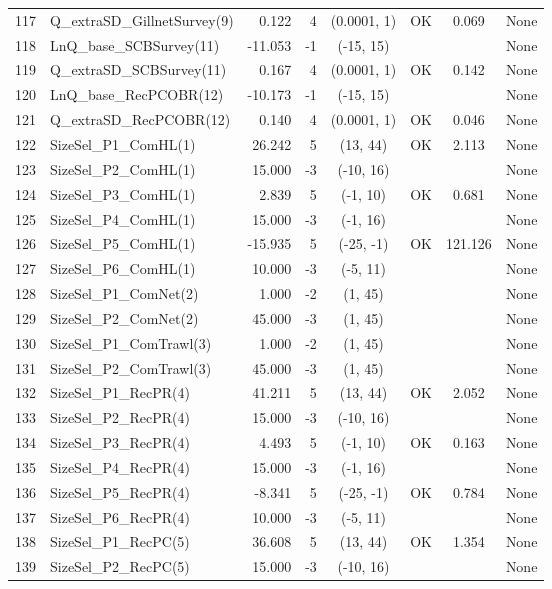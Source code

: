 \documentclass[12pt,]{article}
\begin{document}
\begin{landscape}
\begin{longtable}{rlrrcccl}
  117 & Q\_extraSD\_GillnetSurvey(9) & 0.122 & 4 & (0.0001, 1) & OK & 0.069 & None \\ 
  118 & LnQ\_base\_SCBSurvey(11) & -11.053 & -1 & (-15, 15) &  &  & None \\ 
  119 & Q\_extraSD\_SCBSurvey(11) & 0.167 & 4 & (0.0001, 1) & OK & 0.142 & None \\ 
  120 & LnQ\_base\_RecPCOBR(12) & -10.173 & -1 & (-15, 15) &  &  & None \\ 
  121 & Q\_extraSD\_RecPCOBR(12) & 0.140 & 4 & (0.0001, 1) & OK & 0.046 & None \\ 
  122 & SizeSel\_P1\_ComHL(1) & 26.242 & 5 & (13, 44) & OK & 2.113 & None \\ 
  123 & SizeSel\_P2\_ComHL(1) & 15.000 & -3 & (-10, 16) &  &  & None \\ 
  124 & SizeSel\_P3\_ComHL(1) & 2.839 & 5 & (-1, 10) & OK & 0.681 & None \\ 
  125 & SizeSel\_P4\_ComHL(1) & 15.000 & -3 & (-1, 16) &  &  & None \\ 
  126 & SizeSel\_P5\_ComHL(1) & -15.935 & 5 & (-25, -1) & OK & 121.126 & None \\ 
  127 & SizeSel\_P6\_ComHL(1) & 10.000 & -3 & (-5, 11) &  &  & None \\ 
  128 & SizeSel\_P1\_ComNet(2) & 1.000 & -2 & (1, 45) &  &  & None \\ 
  129 & SizeSel\_P2\_ComNet(2) & 45.000 & -3 & (1, 45) &  &  & None \\ 
  130 & SizeSel\_P1\_ComTrawl(3) & 1.000 & -2 & (1, 45) &  &  & None \\ 
  131 & SizeSel\_P2\_ComTrawl(3) & 45.000 & -3 & (1, 45) &  &  & None \\ 
  132 & SizeSel\_P1\_RecPR(4) & 41.211 & 5 & (13, 44) & OK & 2.052 & None \\ 
  133 & SizeSel\_P2\_RecPR(4) & 15.000 & -3 & (-10, 16) &  &  & None \\ 
  134 & SizeSel\_P3\_RecPR(4) & 4.493 & 5 & (-1, 10) & OK & 0.163 & None \\ 
  135 & SizeSel\_P4\_RecPR(4) & 15.000 & -3 & (-1, 16) &  &  & None \\ 
  136 & SizeSel\_P5\_RecPR(4) & -8.341 & 5 & (-25, -1) & OK & 0.784 & None \\ 
  137 & SizeSel\_P6\_RecPR(4) & 10.000 & -3 & (-5, 11) &  &  & None \\ 
  138 & SizeSel\_P1\_RecPC(5) & 36.608 & 5 & (13, 44) & OK & 1.354 & None \\ 
  139 & SizeSel\_P2\_RecPC(5) & 15.000 & -3 & (-10, 16) &  &  & None \\ 

\end{longtable}
\end{landscape}
\end{document}
